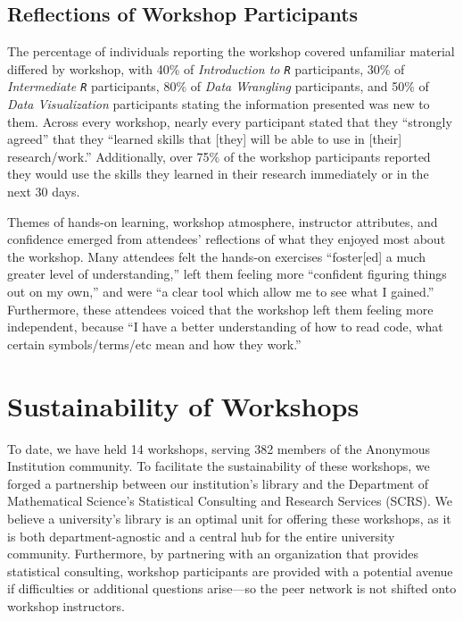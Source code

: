 \documentclass[12pt]{article}
\begin{document}

\subsection{Reflections of Workshop Participants} 

\noindent The percentage of individuals reporting the workshop covered 
unfamiliar material differed by workshop, with 40\% of \emph{Introduction
to \texttt{R}} participants, 30\% of \emph{Intermediate \texttt{R}}
participants, 80\% of \emph{Data Wrangling} participants, and 50\% of 
\emph{Data Visualization} participants stating the information presented was
new to them. Across every workshop, nearly every participant stated that they
``strongly agreed'' that they ``learned skills that [they] will be able to use
in [their] research/work.'' Additionally, over 75\% of the workshop participants
reported they would use the skills they learned in their research immediately or
in the next 30 days. 

\quad Themes of hands-on learning, workshop atmosphere, instructor attributes,
and confidence emerged from attendees' reflections of what they enjoyed most
about the workshop. Many attendees felt the hands-on exercises ``foster[ed] a
much greater level of understanding,'' left them feeling more ``confident
figuring things out on my own,'' and were ``a clear tool which allow me to see
what I gained.'' Furthermore, these attendees voiced that the workshop left them
feeling more independent, because ``I have a better understanding of how to read
code, what certain symbols/terms/etc mean and how they work.'' 

\section{Sustainability of Workshops}  
\label{sec:sustainability}

To date, we have held 14 workshops, serving 382 members of the Anonymous
Institution community. To facilitate the sustainability of these workshops, we
forged a partnership between our institution's library and the Department of
Mathematical Science's Statistical Consulting and Research Services (SCRS). We
believe a university's library is an optimal unit for offering these workshops,
as it is both department-agnostic and a central hub for the entire university
community. Furthermore, by partnering with an organization that provides
statistical consulting, workshop participants are provided with a potential
avenue if difficulties or additional questions arise---so the peer network is
not shifted onto workshop instructors. 
\end{document}
